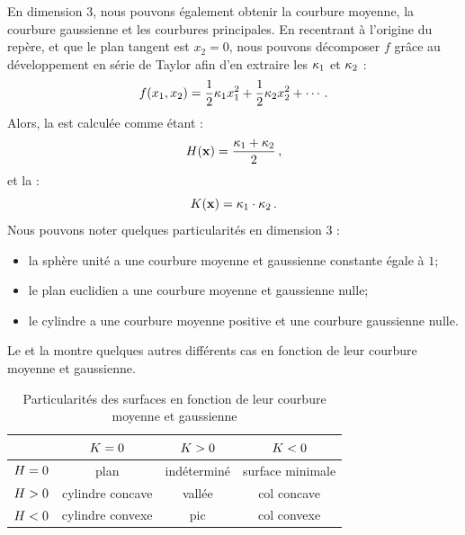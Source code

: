 %     


En dimension 3, nous pouvons également obtenir la courbure moyenne, la courbure
gaussienne et les courbures principales. En recentrant à l'origine du repère, et
que le plan tangent est $x_2 = 0$, nous pouvons décomposer $f$ grâce au
développement en série de Taylor \cite{Taylor1717} afin d'en extraire les
 $\kappa_{1}$ et $\kappa_{2}$ :
%
\begin{equation}
  f(x_1,x_2) = \frac{1}{2}\kappa_{1}x_1^2 + \frac{1}{2}\kappa_{2}x_2^2 + \cdots \,.
\end{equation}
%
Alors, la  est calculée comme étant :
%
\begin{equation}
  H(\mathbf{x}) = \frac{\kappa_{1} + \kappa_{2}}{2} \,,
\end{equation}
%
et la  :
%
\begin{equation}
  K(\mathbf{x}) = \kappa_{1} \cdot \kappa_{2} \,.
\end{equation}
%
Nous pouvons noter quelques particularités en dimension 3 :
\begin{itemize}
  \item la sphère unité a une courbure moyenne et gaussienne constante égale à $1$;
  \item le plan euclidien a une courbure moyenne et gaussienne nulle;
  \item le cylindre a une courbure moyenne positive et une courbure gaussienne nulle.
\end{itemize}
%
Le  et la
 montre quelques autres différents cas en
fonction de leur courbure moyenne et gaussienne.


\begin{table}[ht]
\centering
\caption{Particularités des surfaces en fonction de leur courbure moyenne et gaussienne}
\label{tab:courbure-particularities}
\begin{tabular}{@{}lccc@{}}
\toprule
                  & $K = 0$   & $K > 0$   & $K < 0$   \\ \midrule
$H = 0$   & plan               & indéterminé        & surface minimale   \\
$H > 0$   & cylindre concave   & vallée             & col concave        \\
$H < 0$   & cylindre convexe   & pic                & col convexe        \\ \bottomrule
\end{tabular}
\end{table}


